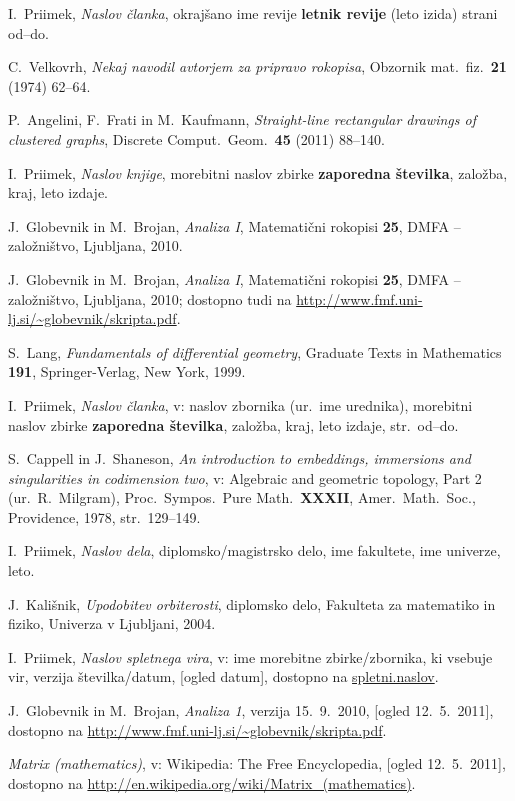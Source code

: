 \documentclass[mat1]{fmfdelo}
\begin{document}
\begin{thebibliography}{99}


I.~Priimek, \emph{Naslov članka}, okrajšano ime revije \textbf{letnik revije} (leto izida) strani od--do.

C.~Velkovrh, \emph{Nekaj navodil avtorjem za pripravo rokopisa}, Obzornik mat.\ fiz.\ \textbf{21} (1974) 62--64.

P.~Angelini, F.~Frati in M.~Kaufmann, \emph{Straight-line rectangular drawings of clustered graphs}, Discrete Comput.\ Geom.\ \textbf{45} (2011) 88--140.


I.~Priimek, \emph{Naslov knjige}, morebitni naslov zbirke  \textbf{zaporedna številka}, založba, kraj, leto izdaje.

J.~Globevnik in M.~Brojan, \emph{Analiza I}, Matematični rokopisi \textbf{25}, DMFA -- založništvo, Ljubljana, 2010.

J.~Globevnik in M.~Brojan, \emph{Analiza I}, Matematični rokopisi \textbf{25}, DMFA -- založništvo, Ljubljana, 2010; dostopno tudi na
\url{http://www.fmf.uni-lj.si/~globevnik/skripta.pdf}.

S.~Lang, \emph{Fundamentals of differential geometry}, Graduate Texts in Mathematics {\bf 191}, Springer-Verlag, New York, 1999.



I.~Priimek, \emph{Naslov članka}, v: naslov zbornika (ur.\ ime urednika), morebitni naslov zbirke  \textbf{zaporedna številka}, založba, kraj, leto izdaje, str.\ od--do.

S.~Cappell in J.~Shaneson, \emph{An introduction to embeddings, immersions and singularities in codimension two}, v: Algebraic and geometric topology, Part 2 (ur.\ R.~Milgram), Proc.\ Sympos.\ Pure Math.\ \textbf{XXXII}, Amer.\ Math.\ Soc., Providence, 1978, str.\ 129--149.

I.~Priimek, \emph{Naslov dela}, diplomsko/magistrsko delo, ime fakultete, ime univerze, leto.

J.~Kališnik, \emph{Upodobitev orbiterosti}, diplomsko delo, Fakulteta za matematiko in fiziko, Univerza v Ljubljani, 2004.

I.~Priimek, \emph{Naslov spletnega vira}, v: ime morebitne zbirke/zbornika, ki vsebuje vir, verzija številka/datum, [ogled datum], dostopno na \url{spletni.naslov}.

J.~Globevnik in M.~Brojan, \emph{Analiza 1}, verzija 15.~9.~2010, [ogled 12.~5.~2011], dostopno na \url{http://www.fmf.uni-lj.si/~globevnik/skripta.pdf}.

\emph{Matrix (mathematics)}, v: Wikipedia: The Free Encyclopedia, [ogled 12.~5.~2011], dostopno na \url{http://en.wikipedia.org/wiki/Matrix_(mathematics)}.

\end{thebibliography}
\end{document}
